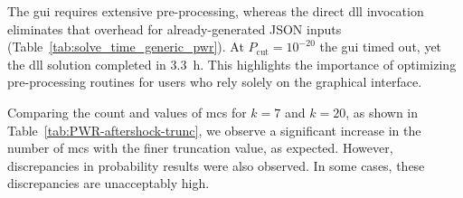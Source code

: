 The \acrshort{gui} requires extensive pre-processing, whereas the direct \acrshort{dll} invocation eliminates that overhead for already-generated JSON inputs (Table~\ref{tab:solve_time_generic_pwr}).  At $P_{\text{cut}}=10^{-20}$ the \acrshort{gui} timed out, yet the \acrshort{dll} solution completed in \SI{3.3}{h}.  This highlights the importance of optimizing pre-processing routines for users who rely solely on the graphical interface.

Comparing the count and values of \acrfull{mcs} for $k=7$ and $k=20$, as shown in Table~\ref{tab:PWR-aftershock-trunc}, we observe a significant increase in the number of \acrshort{mcs} with the finer truncation value, as expected. However, discrepancies in probability results were also observed. In some cases, these discrepancies are unacceptably high.

